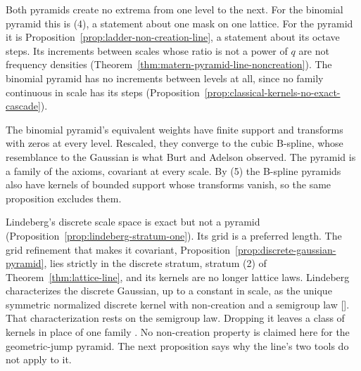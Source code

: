 Both pyramids create no extrema from one level to the next. For the binomial pyramid this is (4), a
statement about one mask on one lattice. For the \Matern{} pyramid it is
Proposition~\ref{prop:ladder-non-creation-line}, a statement about its octave steps. Its increments
between scales whose ratio is not a power of $q$ are not \Polya{} frequency densities
(Theorem~\ref{thm:matern-pyramid-line-noncreation}). The binomial pyramid has no increments between
levels at all, since no family continuous in scale has its steps
(Proposition~\ref{prop:classical-kernels-no-exact-cascade}).

The binomial pyramid's equivalent weights have finite support and transforms with zeros at every
level. Rescaled, they converge to the cubic B-spline, whose resemblance to the Gaussian is what Burt
and Adelson observed. The \Matern{} pyramid is a family of the axioms, covariant at every scale. By
(5) the B-spline pyramids also have kernels of bounded support whose transforms vanish, so the same
proposition excludes them.

Lindeberg's discrete scale space is exact but not a pyramid
(Proposition~\ref{prop:lindeberg-stratum-one}). Its grid is a preferred length. The grid refinement
that makes it covariant, Proposition~\ref{prop:discrete-gaussian-pyramid}, lies strictly in the
discrete stratum, stratum (2) of Theorem~\ref{thm:lattice-line}, and its kernels are no longer
lattice laws. Lindeberg characterizes the discrete Gaussian, up to a constant in scale, as the unique
symmetric normalized discrete kernel with non-creation and a semigroup law
[]. That characterization rests on
the semigroup law. Dropping it leaves a class of kernels in place of one family
. No non-creation property is claimed here for the
geometric-jump pyramid. The next proposition says why the line's two tools do not apply to it.

